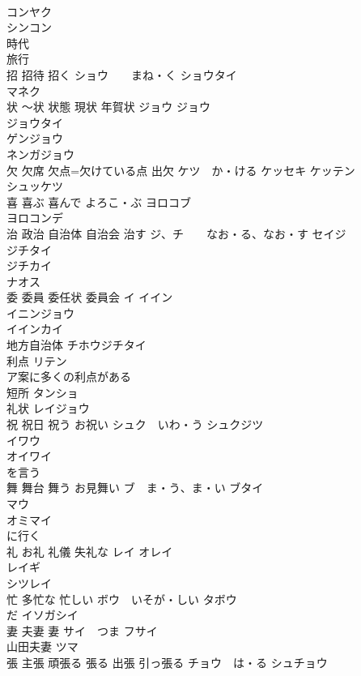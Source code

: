 \documentclass[8pt]{extreport}
\begin{document}
\begin{CJK}{UTF8}{min}
\\	コンヤク 
\\	シンコン 
\\	時代 
\\	旅行 
\\	招 招待 招く	ショウ　　まね・く ショウタイ 
\\	マネク 
\\	状 〜状 状態 現状 年賀状	ジョウ ジョウ　
\\	ジョウタイ 
\\	ゲンジョウ 
\\	ネンガジョウ 
\\	欠 欠席 欠点=欠けている点 出欠	ケツ　か・ける ケッセキ ケッテン 
\\	シュッケツ 
\\	喜 喜ぶ 喜んで	よろこ・ぶ ヨロコブ 
\\	ヨロコンデ 
\\	治 政治 自治体 自治会 治す	ジ、チ　　なお・る、なお・す セイジ 
\\	ジチタイ 
\\	ジチカイ 
\\	ナオス 
\\	委 委員 委任状 委員会	イ イイン 
\\	イニンジョウ 
\\	イインカイ 
\\	地方自治体	チホウジチタイ 
\\	利点	リテン 
\\	ア案に多くの利点がある
\\	短所	タンショ 
\\	礼状	レイジョウ 
\\	祝 祝日 祝う お祝い	シュク　いわ・う シュクジツ 
\\	イワウ 
\\	オイワイ 
\\	を言う
\\	舞 舞台 舞う お見舞い	ブ　ま・う、ま・い ブタイ 
\\	マウ　
\\	オミマイ 
\\	に行く 
\\	礼 お礼 礼儀 失礼な	レイ オレイ 
\\	レイギ　
\\	シツレイ 
\\	忙 多忙な 忙しい	ボウ　いそが・しい タボウ 
\\	だ イソガシイ
\\	妻 夫妻 妻	サイ　つま フサイ
\\	山田夫妻 ツマ
\\	張 主張 頑張る 張る 出張 引っ張る	チョウ　は・る シュチョウ 

\end{CJK}
\end{document}
